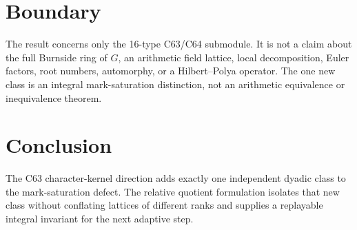 \documentclass[10pt]{article}
\begin{document}
\section{Boundary}
The result concerns only the 16-type C63/C64 submodule.  It is not a claim
about the full Burnside ring of $G$, an arithmetic field lattice, local
decomposition, Euler factors, root numbers, automorphy, or a Hilbert--Polya
operator.  The one new class is an integral mark-saturation distinction, not
an arithmetic equivalence or inequivalence theorem.

\section{Conclusion}
The C63 character-kernel direction adds exactly one independent dyadic class
to the mark-saturation defect.  The relative quotient formulation isolates
that new class without conflating lattices of different ranks and supplies a
replayable integral invariant for the next adaptive step.



\end{document}
